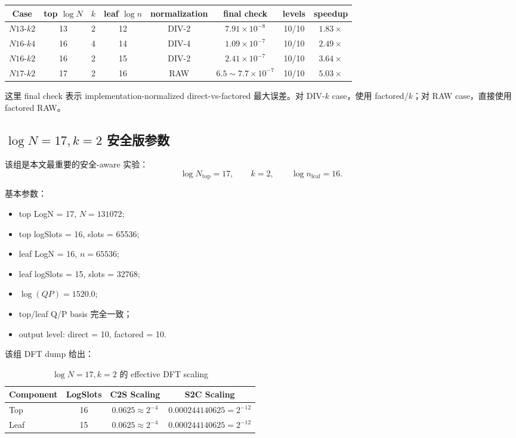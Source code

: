 \documentclass[UTF8,a4paper,11pt]{ctexart}
\begin{document}
\begin{longtable}{cccccccc}
\toprule
Case & top $\log N$ & $k$ & leaf $\log n$ & normalization & final check & levels & speedup \\
\midrule
$N13$-$k2$ & 13 & 2 & 12 & DIV-2 & $7.91\times10^{-8}$ & 10/10 & $1.83\times$ \\
$N16$-$k4$ & 16 & 4 & 14 & DIV-4 & $1.09\times10^{-7}$ & 10/10 & $2.49\times$ \\
$N16$-$k2$ & 16 & 2 & 15 & DIV-2 & $2.41\times10^{-7}$ & 10/10 & $3.64\times$ \\
$N17$-$k2$ & 17 & 2 & 16 & RAW & $6.5\sim7.7\times10^{-7}$ & 10/10 & $5.03\times$ \\
\bottomrule
\end{longtable}

这里 final check 表示 implementation-normalized direct-vs-factored 最大误差。对 DIV-$k$ case，使用 factored/$k$；对 RAW case，直接使用 factored RAW。

\subsection{$\log N=17,k=2$ 安全版参数}

该组是本文最重要的安全-aware 实验：
\begin{equation}
\log N_{\mathrm{top}}=17,
\qquad
k=2,
\qquad
\log n_{\mathrm{leaf}}=16.
\end{equation}

基本参数：
\begin{itemize}[leftmargin=2em]
\item top LogN = 17, $N=131072$;
\item top logSlots = 16, slots = 65536;
\item leaf LogN = 16, $n=65536$;
\item leaf logSlots = 15, slots = 32768;
\item $\log(QP)=1520.0$;
\item top/leaf Q/P basis 完全一致；
\item output level: direct = 10, factored = 10.
\end{itemize}

该组 DFT dump 给出：

\begin{table}[H]
\centering
\caption{$\log N=17,k=2$ 的 effective DFT scaling}
\begin{tabular}{lccc}
\toprule
Component & LogSlots & C2S Scaling & S2C Scaling \\
\midrule
Top & 16 & $0.0625\approx2^{-4}$ & $0.000244140625=2^{-12}$ \\
Leaf & 15 & $0.0625\approx2^{-4}$ & $0.000244140625=2^{-12}$ \\
\bottomrule
\end{tabular}
\end{table}
\end{document}
